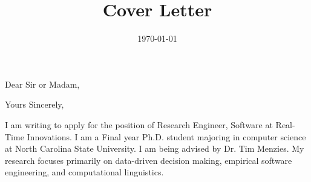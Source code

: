 \documentclass[10pt,letterpaper,sans]{moderncv}         \moderncvstyle{casual}
\title{Cover Letter}
\begin{document}
\date{\today}
\opening{Dear Sir or Madam,}
\closing{Yours Sincerely,}

\makelettertitle

I am writing to apply for the position of Research Engineer, Software at Real-Time Innovations. I am a Final year Ph.D. student majoring in computer science at North Carolina State University. I am being advised by Dr. Tim Menzies. My research focuses primarily on data-driven decision making, empirical software engineering, and computational linguistics.
\end{document}
